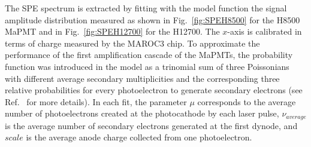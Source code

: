 \documentclass[5p,times,twocolumn]{elsarticle}
\begin{document}
The SPE spectrum is extracted by fitting with the model function the signal amplitude distribution measured 
as shown in Fig.~\ref{fig:SPEH8500} for the H8500 MaPMT and in Fig.~\ref{fig:SPEH12700} for the H12700.
The $x$-axis is calibrated in terms of charge measured by the MAROC3 chip.
To approximate the performance of the first amplification cascade of the MaPMTs, the probability function
 was introduced in the model as a trinomial sum of three Poissonians with different average secondary
multiplicities and the corresponding three relative probabilities for every photoelectron to generate secondary
electrons (see Ref.~\cite{Pavel} for more details).
In each fit, the parameter $\mu$ corresponds to the average number of photoelectrons created at the photocathode by
each laser pulse, $\nu_{average}$ is the average number of secondary electrons generated at the first dynode, and $scale$ is the 
average anode charge collected from one photoelectron. 
\end{document}

